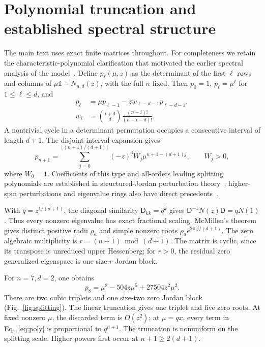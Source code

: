 \documentclass[aps,pra,reprint,superscriptaddress,nofootinbib,floatfix]{revtex4-2}
\newcommand{\ii}{\mathrm{i}}
\begin{document}
\section{Polynomial truncation and established spectral structure}
The main text uses exact finite matrices throughout. For completeness we retain the characteristic-polynomial clarification that motivated the earlier spectral analysis of the model~\cite{XuYi}. Define $p_\ell(\mu,z)$ as the determinant of the first $\ell$ rows and columns of $\mu\mathbb1-N_{n,d}(z)$, with the full $n$ fixed. Then $p_0=1$, $p_\ell=\mu^\ell$ for $1\le\ell\le d$, and
\begin{align}
p_\ell&=\mu p_{\ell-1}-z w_{\ell-d-1}p_{\ell-d-1},\nonumber\\
w_i&=\binom{i+d}{d}\frac{(n-i)!}{(n-i-d)!}.
\end{align}
A nontrivial cycle in a determinant permutation occupies a consecutive interval of length $d+1$. The disjoint-interval expansion gives
\begin{equation}
p_{n+1}=\sum_{j=0}^{\lfloor(n+1)/(d+1)\rfloor}(-z)^jW_j\mu^{n+1-(d+1)j},\qquad W_j>0,
\label{eq:poly}
\end{equation}
where $W_0=1$. Coefficients of this type and all-orders leading splitting polynomials are established in structured-Jordan perturbation theory~\cite{MaEdelman}; higher-spin perturbations and eigenvalue rings also have direct precedents~\cite{Graefe}.

With $q=z^{1/(d+1)}$, the diagonal similarity $\mathsf D_{kk}=q^k$ gives $\mathsf D^{-1}N(z)\mathsf D=qN(1)$. Thus every nonzero eigenvalue has exact fractional scaling. McMillen's theorem~\cite{McMillen} gives distinct positive radii $\rho_a$ and simple nonzero roots $\rho_a e^{2\pi\ii j/(d+1)}$. The zero algebraic multiplicity is $r=(n+1)\bmod(d+1)$. The matrix is cyclic, since its transpose is unreduced upper Hessenberg; for $r>0$, the residual zero generalized eigenspace is one size-$r$ Jordan block.

For $n=7,d=2$, one obtains
\begin{equation}
p_8=\mu^8-504z\mu^5+27504z^2\mu^2.
\end{equation}
There are two cubic triplets and one size-two zero Jordan block (Fig.~\ref{fig:splitting}). The linear truncation gives one triplet and five zero roots. At fixed nonzero $\mu$, the discarded term is $O(z^2)$; at $\mu=qx$, every term in Eq.~\eqref{eq:poly} is proportional to $q^{n+1}$. The truncation is nonuniform on the splitting scale. Higher powers first occur at $n+1\ge2(d+1)$.
\end{document}
